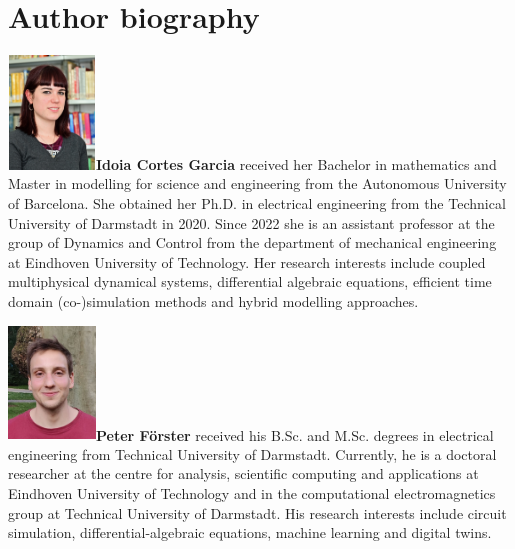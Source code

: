 \documentclass[AMA,STIX1COL]{WileyNJD-v2}
\begin{document}




\clearpage

\section*{Author biography}
\begin{biography}{\includegraphics[width=66pt,height=86pt]{cortes}}{\textbf{Idoia Cortes Garcia} received her Bachelor in mathematics and Master in modelling for science and engineering from the Autonomous University of Barcelona. She obtained her Ph.D. in electrical engineering from the Technical University of Darmstadt in 2020. Since 2022 she is an assistant professor at the group of Dynamics and Control from the department of mechanical engineering at Eindhoven University of Technology. Her research interests include coupled multiphysical dynamical systems, differential algebraic equations, efficient time domain (co-)simulation methods and hybrid modelling approaches.}
\end{biography}
\vspace{0.5cm}
\begin{biography}{\includegraphics[width=66pt,height=86pt]{forster}}{\textbf{Peter Förster} received his B.Sc. and M.Sc. degrees in electrical engineering from Technical University of Darmstadt. Currently, he is a doctoral researcher at the centre for analysis, scientific computing and applications at Eindhoven University of Technology and in the computational electromagnetics group at Technical University of Darmstadt. His research interests include circuit simulation, differential-algebraic equations, machine learning and digital twins.}
\end{biography}
\end{document}
